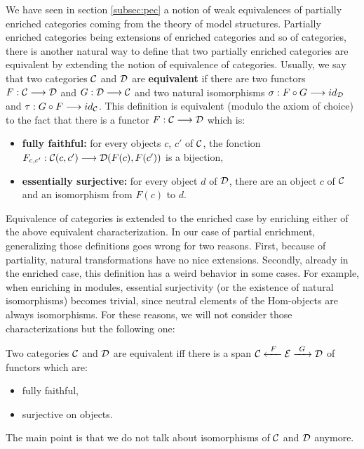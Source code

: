 	We have seen in section \ref{subsec:pec} a notion of weak equivalences of partially enriched categories coming from the theory of model structures. Partially enriched categories being extensions of enriched categories and so of categories, there is another natural way to define that two partially enriched categories are equivalent by extending the notion of equivalence of categories. Usually, we say that two categories $\mathcal{C}$ and $\mathcal{D}$ are \textbf{equivalent} if there are two functors $F : \mathcal{C} \longrightarrow \mathcal{D}$ and $G : \mathcal{D} \longrightarrow \mathcal{C}$ and two natural isomorphisms $\sigma : F\circ G \longrightarrow id_{\mathcal{D}}$ and $\tau : G\circ F \longrightarrow id_{\mathcal{C}}$. This definition is equivalent (modulo the axiom of choice) to the fact that there is a functor $F : \mathcal{C} \longrightarrow \mathcal{D}$ which is:
	\begin{itemize}
		\item \textbf{fully faithful:} for every objects $c$, $c'$ of $\mathcal{C}$, the fonction $F_{c,c'} : \mathcal{C}(c,c') \longrightarrow \mathcal{D}(F(c),F(c'))$ is a bijection,
		\item \textbf{essentially surjective:} for every object $d$ of $\mathcal{D}$, there are an object $c$ of $\mathcal{C}$ and an isomorphism from $F(c)$ to $d$.
	\end{itemize}
	
	Equivalence of categories is extended to the enriched case by enriching either of the above equivalent characterization. In our case of partial enrichment, generalizing those definitions goes wrong for two reasons. First, because of partiality, natural transformations have no nice extensions. Secondly, already in the enriched case, this definition has a weird behavior in some cases. For example, when enriching in modules, essential surjectivity (or the existence of natural isomorphisms) becomes trivial, since neutral elements of the Hom-objects are always isomorphisms. For these reasons, we will not consider those characterizations but the following one:
	
	\begin{prop}
	Two categories $\mathcal{C}$ and $\mathcal{D}$ are equivalent iff there is a span $\mathcal{C} \xleftarrow{~ F ~} \mathcal{E} \xrightarrow{~ G ~} \mathcal{D}$ of functors which are:
	\begin{itemize}
		\item fully faithful,
		\item surjective on objects.
	\end{itemize}
	\end{prop}
	
	The main point is that we do not talk about isomorphisms of $\mathcal{C}$ and $\mathcal{D}$ anymore.
	
